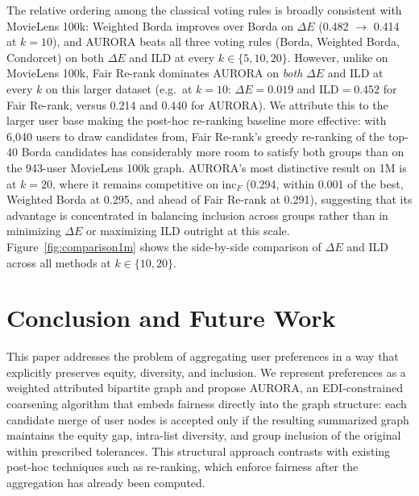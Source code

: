 \documentclass[a4paper,fleqn]{cas-dc}
\begin{document}
The relative ordering among the classical voting rules is broadly consistent
with MovieLens 100k: Weighted Borda improves over Borda on $\Delta E$ (0.482
$\to$ 0.414 at $k=10$), and AURORA beats all three voting rules (Borda, Weighted
Borda, Condorcet) on both $\Delta E$ and ILD at every $k \in \{5,10,20\}$.
However, unlike on MovieLens 100k, Fair Re-rank dominates AURORA on
\emph{both} $\Delta E$ and ILD at every $k$ on this larger dataset (e.g.\ at
$k=10$: $\Delta E=0.019$ and ILD$=0.452$ for Fair Re-rank, versus 0.214 and
0.440 for AURORA). We attribute this to the larger user base making the
post-hoc re-ranking baseline more effective: with 6,040 users to draw
candidates from, Fair Re-rank's greedy re-ranking of the top-40 Borda
candidates has considerably more room to satisfy both groups than on the
943-user MovieLens 100k graph. AURORA's most distinctive result on 1M is at
$k=20$, where it remains competitive on $\mathrm{inc}_F$ (0.294, within
0.001 of the best, Weighted Borda at 0.295, and ahead of Fair Re-rank at
0.291), suggesting that its advantage is concentrated in balancing inclusion across
groups rather than in minimizing $\Delta E$ or maximizing ILD outright at
this scale. Figure~\ref{fig:comparison1m} shows the side-by-side comparison of $\Delta E$ and
ILD across all methods at $k \in \{10, 20\}$.



\section{Conclusion and Future Work}
\label{sec:conclusion}

This paper addresses the problem of aggregating user preferences in a way that
explicitly preserves equity, diversity, and inclusion. We represent preferences
as a weighted attributed bipartite graph and propose AURORA, an EDI-constrained
coarsening algorithm that embeds fairness directly into the graph structure: each
candidate merge of user nodes is accepted only if the resulting summarized graph
maintains the equity gap, intra-list diversity, and group inclusion of the original
within prescribed tolerances. This structural approach contrasts with existing
post-hoc techniques such as re-ranking, which enforce fairness after the
aggregation has already been computed.
\end{document}
